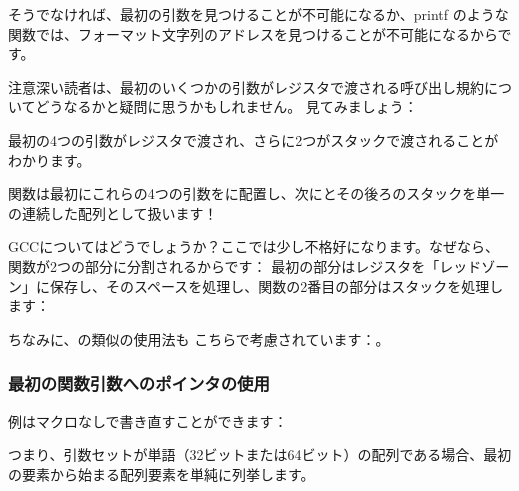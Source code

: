 そうでなければ、最初の引数を見つけることが不可能になるか、printf のような関数では、フォーマット文字列のアドレスを見つけることが不可能になるからです。

\label{variadic_arith_registers}

注意深い読者は、最初のいくつかの引数がレジスタで渡される呼び出し規約についてどうなるかと疑問に思うかもしれません。
見てみましょう：



最初の4つの引数がレジスタで渡され、さらに2つがスタックで渡されることがわかります。

関数は最初にこれらの4つの引数をに配置し、次にとその後ろのスタックを単一の連続した配列として扱います！

GCCについてはどうでしょうか？ここでは少し不格好になります。なぜなら、関数が2つの部分に分割されるからです：
最初の部分はレジスタを「レッドゾーン」に保存し、そのスペースを処理し、関数の2番目の部分はスタックを処理します：



ちなみに、の類似の使用法も こちらで考慮されています：。

\subsubsection{最初の関数引数へのポインタの使用}

例はマクロなしで書き直すことができます：



つまり、引数セットが単語（32ビットまたは64ビット）の配列である場合、最初の要素から始まる配列要素を単純に列挙します。